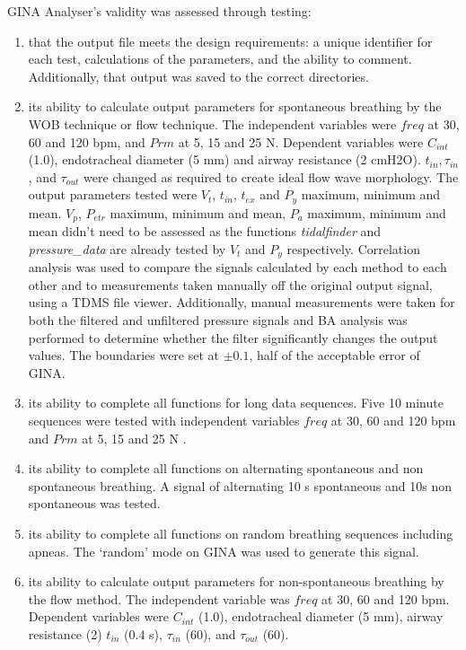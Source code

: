 \documentclass[12pt, openany, oneside]{book}
\begin{document}
GINA Analyser's validity was assessed through testing:
\begin{enumerate}
\item that the output file meets the design requirements: a unique identifier for each test, calculations of the parameters, and the ability to comment. Additionally, that output was saved to the correct directories.
\item its ability to calculate output parameters for spontaneous breathing by the WOB technique or flow technique. The independent variables were $freq$ at 30, 60 and 120 bpm, and $Prm$ at 5, 15 and 25 N. Dependent variables were $C_{int}$ (1.0), endotracheal diameter (5 mm) and airway resistance (2 cmH2O). $t_{in}, \tau_{in}$, and $\tau_{out}$ were changed as required to create ideal flow wave morphology.  The output parameters tested were $V_t$, $t_{in}$, $t_{ex}$ and $P_y$ maximum, minimum and mean. $V_p$,  $P_{etr}$ maximum, minimum and mean, $P_a$ maximum, minimum and mean didn't need to be assessed as the functions \textit{tidalfinder} and \textit{pressure\_data} are already tested by $V_t$ and $P_y$ respectively. Correlation analysis was used to compare the signals calculated by each method to each other and to measurements taken manually off the original output signal, using a TDMS file viewer. Additionally, manual measurements were taken for both the filtered and unfiltered pressure signals and BA analysis was performed to determine whether the filter significantly changes the output values. The boundaries were set at $\pm0.1$, half of the acceptable error of GINA.
\item its ability to complete all functions for long data sequences. Five 10 minute sequences were tested with independent variables $freq$ at 30, 60 and 120 bpm and  $Prm$ at 5, 15 and 25 N .
\item its ability to complete all functions on alternating spontaneous and non spontaneous breathing. A signal of alternating 10 s spontaneous and 10s non spontaneous was tested. 
\item its ability to complete all functions on random breathing sequences  including apneas. The `random' mode on GINA was used to generate this signal.
\item its ability to calculate output parameters for non-spontaneous breathing by the flow method. The independent variable was $freq$ at 30, 60 and 120 bpm.  Dependent variables were $C_{int}$ (1.0), endotracheal diameter (5 mm), airway resistance (2) $t_{in}$ (0.4 s), $\tau_{in}$ (60), and $\tau_{out}$ (60).
\end{enumerate}
\end{document}
